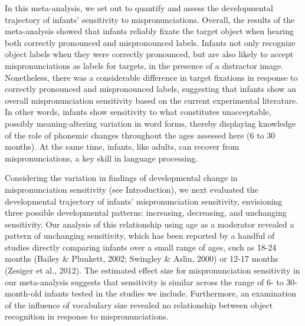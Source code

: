 \documentclass[man]{apa6}
\begin{document}
In this meta-analysis, we set out to quantify and assess the developmental trajectory of infants' sensitivity to mispronunciations. Overall, the results of the meta-analysis showed that infants reliably fixate the target object when hearing both correctly pronounced and mispronounced labels. Infants not only recognize object labels when they were correctly pronounced, but are also likely to accept mispronunciations as labels for targets, in the presence of a distractor image. Nonetheless, there was a considerable difference in target fixations in response to correctly pronounced and mispronounced labels, suggesting that infants show an overall mispronunciation sensitivity based on the current experimental literature. In other words, infants show sensitivity to what constitutes unacceptable, possibly meaning-altering variation in word forms, thereby displaying knowledge of the role of phonemic changes throughout the ages assessed here (6 to 30 months). At the same time, infants, like adults, can recover from mispronunciations, a key skill in language processing.

Considering the variation in findings of developmental change in mispronunciation sensitivity (see Introduction), we next evaluated the developmental trajectory of infants' mispronunciation sensitivity, envisioning three possible developmental patterns: increasing, decreasing, and unchanging sensitivity. Our analysis of this relationship using age as a moderator revealed a pattern of unchanging sensitivity, which has been reported by a handful of studies directly comparing infants over a small range of ages, such as 18-24 months (Bailey \& Plunkett, 2002; Swingley \& Aslin, 2000) or 12-17 months (Zesiger et al., 2012). The estimated effect size for mispronunciation sensitivity in our meta-analysis suggests that sensitivity is similar across the range of 6- to 30-month-old infants tested in the studies we include. Furthermore, an examination of the influence of vocabulary size revealed no relationship between object recognition in response to mispronunciations.
\end{document}
